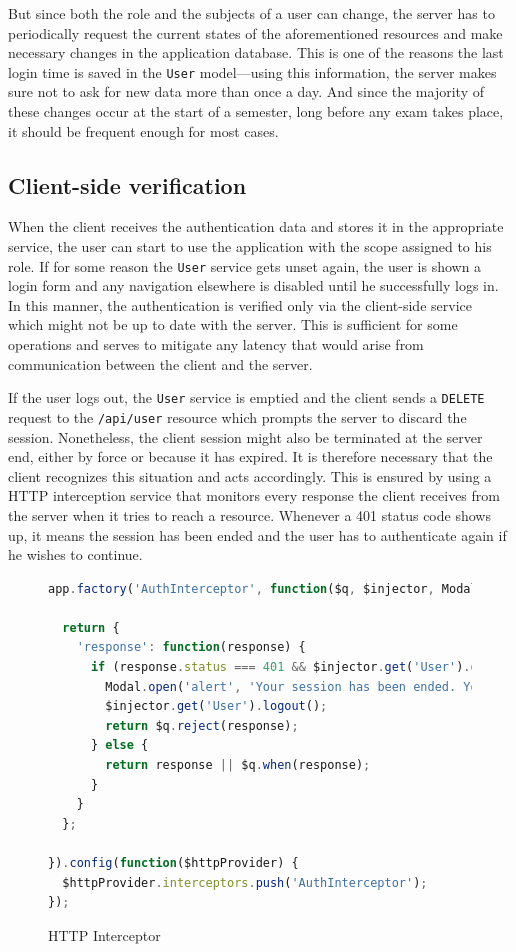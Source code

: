 \documentclass[thesis=M,english,hidelinks]{FITthesis}[2012/10/20]
\newcommand{\code}{\texttt}
\begin{document}
But since both the role and the subjects of a user can change, the server has to periodically request the current states of the aforementioned resources and make necessary changes in the application database. This is one of the reasons the last login time is saved in the \code{User} model---using this information, the server makes sure not to ask for new data more than once a day. And since the majority of these changes occur at the start of a semester, long before any exam takes place, it should be frequent enough for most cases.

    \subsection{Client-side verification}

When the client receives the authentication data and stores it in the appropriate service, the user can start to use the application with the scope assigned to his role. If for some reason the \code{User} service gets unset again, the user is shown a login form and any navigation elsewhere is disabled until he successfully logs in. In this manner, the authentication is verified only via the client-side service which might not be up to date with the server. This is sufficient for some operations and serves to mitigate any latency that would arise from communication between the client and the server.

If the user logs out, the \code{User} service is emptied and the client sends a \code{DELETE} request to the \code{/api/user} resource which prompts the server to discard the session. Nonetheless, the client session might also be terminated at the server end, either by force or because it has expired. It is therefore necessary that the client recognizes this situation and acts accordingly. This is ensured by using a HTTP interception service that monitors every response the client receives from the server when it tries to reach a resource. Whenever a 401 status code shows up, it means the session has been ended and the user has to authenticate again if he wishes to continue.

\begin{figure}[h]
  \begin{lstlisting}[language=JavaScript]
app.factory('AuthInterceptor', function($q, $injector, Modal) {

  return {
    'response': function(response) {
      if (response.status === 401 && $injector.get('User').data) {
        Modal.open('alert', 'Your session has been ended. You will have to authenticate.', null, 'Log in');
        $injector.get('User').logout();
        return $q.reject(response);
      } else {
        return response || $q.when(response);
      }
    }
  };

}).config(function($httpProvider) {
  $httpProvider.interceptors.push('AuthInterceptor');
});
  \end{lstlisting}
  \caption{HTTP Interceptor}
  \label{fig:http_interceptor}
\end{figure}
\end{document}
